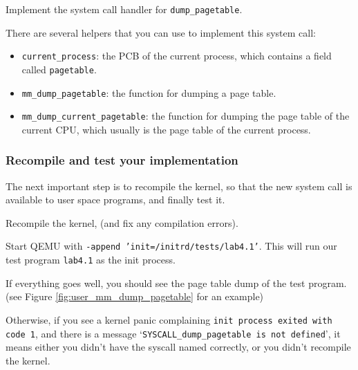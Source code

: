 \begin{exercise}
    \item Implement the system call handler for \texttt{dump\_pagetable}.
\end{exercise}

There are several helpers that you can use to implement this system call:

\begin{itemize}
    \item \texttt{current\_process}: the PCB of the current process, which contains
          a field called \texttt{pagetable}.
    \item \texttt{mm\_dump\_pagetable}: the function for dumping a page table.
    \item \texttt{mm\_dump\_current\_pagetable}: the function for dumping the page
          table of the current CPU, which usually is the page table of the current
          process.
\end{itemize}

\subsubsection{Recompile and test your implementation}

The next important step is to recompile the kernel, so that the new system call
is available to user space programs, and finally test it.

\begin{exercise}
    \item Recompile the kernel, (and fix any compilation errors).
    \item Start QEMU with \texttt{-append 'init=/initrd/tests/lab4.1'}.
    This will run our test program \texttt{lab4.1} as the init process.
\end{exercise}

If everything goes well, you should see the page table dump of the test program.
(see Figure \ref{fig:user_mm_dump_pagetable} for an example)

Otherwise, if you see a kernel panic complaining \texttt{init process exited with code 1},
and there is a message `\texttt{SYSCALL\_dump\_pagetable is not defined}', it means
either you didn't have the syscall named correctly, or you didn't recompile the kernel.

